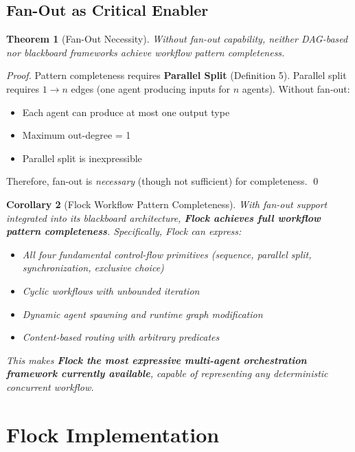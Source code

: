 \documentclass[11pt]{article}
\newtheorem{theorem}{Theorem}
\newtheorem{corollary}[theorem]{Corollary}
\begin{document}
\subsection{Fan-Out as Critical Enabler}

\begin{theorem}[Fan-Out Necessity]
Without fan-out capability, neither DAG-based nor blackboard frameworks achieve workflow pattern completeness.
\end{theorem}

\begin{proof}
Pattern completeness requires \textbf{Parallel Split} (Definition 5). Parallel split requires $1 \rightarrow n$ edges (one agent producing inputs for $n$ agents). Without fan-out:
\begin{itemize}
    \item Each agent can produce at most one output type
    \item Maximum out-degree = 1
    \item Parallel split is inexpressible
\end{itemize}
Therefore, fan-out is \emph{necessary} (though not sufficient) for completeness. \qed
\end{proof}

\begin{corollary}[Flock Workflow Pattern Completeness]
\label{cor:flock-completeness}
With fan-out support integrated into its blackboard architecture, \textbf{Flock achieves full workflow pattern completeness}. Specifically, Flock can express:
\begin{itemize}
    \item All four fundamental control-flow primitives (sequence, parallel split, synchronization, exclusive choice)
    \item Cyclic workflows with unbounded iteration
    \item Dynamic agent spawning and runtime graph modification
    \item Content-based routing with arbitrary predicates
\end{itemize}

This makes \textbf{Flock the most expressive multi-agent orchestration framework currently available}, capable of representing any deterministic concurrent workflow.
\end{corollary}

\section{Flock Implementation}
\end{document}
